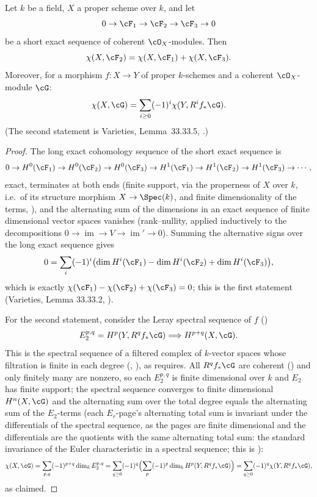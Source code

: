 \begin{lemma}
\label{lem:pc-euler-additive}
Let $k$ be a field, $X$ a proper scheme over $k$, and let
\[
0\to\cF_1\to\cF_2\to\cF_3\to0
\]
be a short exact sequence of coherent $\cO_X$-modules.  Then
\[
\chi(X,\cF_2)=\chi(X,\cF_1)+\chi(X,\cF_3).
\]
Moreover, for a morphism $f:X\to Y$ of proper $k$-schemes and a
coherent $\cO_X$-module $\cG$:
\[
\chi(X,\cG)=\sum_{i\ge0}(-1)^i\chi(Y,R^if_*\cG).
\]
(The second statement is Varieties, Lemma~33.33.5,
.)
\end{lemma}
\begin{proof}
The long exact cohomology sequence of the short exact sequence is
\[
0\to H^0(\cF_1)\to H^0(\cF_2)\to H^0(\cF_3)\to H^1(\cF_1)\to H^1(\cF_2)
\to H^1(\cF_3)\to\cdots,
\]
exact, terminates at both ends (finite support,
 via the properness of $X$ over $k$, i.e.\ of
its structure morphism $X\to\Spec(k)$, and finite
dimensionality of the terms, ), and the
alternating sum of the dimensions in an exact sequence of finite
dimensional vector spaces vanishes (rank--nullity, applied inductively
to the decompositions $0\to\operatorname{im}\to V\to\operatorname{im}'\to0$).  Summing the
alternative signs over the long exact sequence gives
\[
0=\sum_i(-1)^i\bigl(\dim H^i(\cF_1)-\dim H^i(\cF_2)+\dim H^i(\cF_3)\bigr),
\]
which is exactly $\chi(\cF_1)-\chi(\cF_2)+\chi(\cF_3)=0$; this is the
first statement (Varieties, Lemma 33.33.2,
).

For the second statement, consider the Leray spectral sequence of $f$
()
\[
E_2^{p,q}=H^p(Y,R^qf_*\cG)\Longrightarrow H^{p+q}(X,\cG).
\]
This is the spectral sequence of a filtered complex of $k$-vector spaces
whose filtration is finite in each degree
(,
), as
 requires.
All $R^qf_*\cG$ are coherent () and only
finitely many are nonzero, so each $E_2^{p,q}$ is finite dimensional
over $k$ and $E_2$ has finite support; the spectral sequence converges
to finite dimensional $H^n(X,\cG)$ and the alternating sum over the
total degree equals the alternating sum of the $E_2$-terms (each
$E_r$-page's alternating total sum is invariant under the differentials
of the spectral sequence, as the pages are finite dimensional and the
differentials are the quotients with the same alternating total sum:
the standard invariance of the Euler characteristic in a spectral
sequence; this is
):
\[
\chi(X,\cG)=\sum_{p,q}(-1)^{p+q}\dim_kE_2^{p,q}
=\sum_{q\ge0}(-1)^q\Bigl(\sum_p(-1)^p\dim_kH^p(Y,R^qf_*\cG)\Bigr)
=\sum_{q\ge0}(-1)^q\chi(Y,R^qf_*\cG),
\]
as claimed.
\end{proof}

